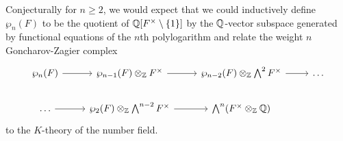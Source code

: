 \begin{remark}
    Conjecturally for $n\geq 2$, we would expect that we could inductively define $\wp_{n}(F)$ to be the quotient of $\mathbb{Q}[F^{\times}\setminus\{1\}]$ by the $\mathbb{Q}$-vector subspace generated by functional equations of the $n$th polylogarithm and relate the weight $n$ Goncharov-Zagier complex
    \begin{equation}\label{eqn: Goncharov-Zagier complex}
        \begin{tikzcd}
            {\wp_{n}(F)} & {\wp_{n-1}(F)\otimes_{\ZZ} F^{\times}} & {\wp_{n-2}(F)\otimes_{\ZZ}\bigwedge^{2}F^{\times}} & \dots \\
            \dots & {\wp_{2}(F)\otimes_{\ZZ}\bigwedge^{n-2}F^{\times}} & {\bigwedge^{n}(F^{\times}\otimes_{\ZZ}\QQ)}
            \arrow[from=1-1, to=1-2]
            \arrow[from=1-2, to=1-3]
            \arrow[from=1-3, to=1-4]
            \arrow[from=2-1, to=2-2]
            \arrow[from=2-2, to=2-3]
        \end{tikzcd}
    \end{equation}
    to the $K$-theory of the number field. 
\end{remark}